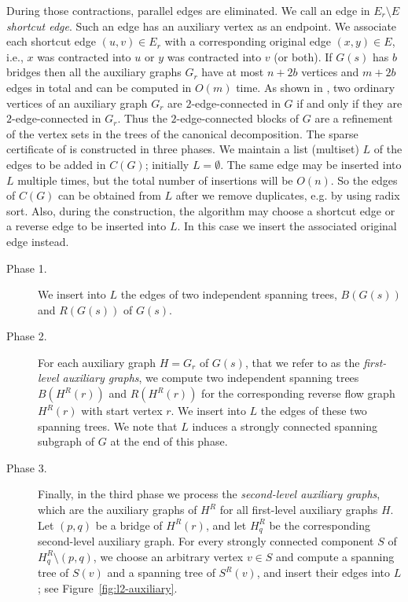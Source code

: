 \documentclass[11pt]{article}
\begin{document}
During those contractions, parallel edges are eliminated. We call an edge in $E_r \setminus E$ \emph{shortcut edge}. Such an edge has an auxiliary vertex as an endpoint.
We associate each shortcut edge $(u,v) \in E_r$  with a corresponding original edge $(x,y) \in E$, i.e., $x$ was contracted into $u$ or $y$ was contracted into $v$ (or both).
If $G(s)$ has $b$ bridges then all the auxiliary graphs $G_r$ have at most $n+2b$ vertices and $m+2b$ edges in total and can be computed in $O(m)$ time.
As shown in \cite{2ECB}, two ordinary vertices of an auxiliary graph $G_r$ are $2$-edge-connected in $G$ if and only if they are $2$-edge-connected in $G_r$.
Thus the $2$-edge-connected blocks of $G$ are a refinement of the vertex sets in the trees of the canonical decomposition.
The sparse certificate of \cite{2ECB} is constructed in three phases.
We maintain a list (multiset) $L$ of the edges to be added in $C(G)$; initially $L=\emptyset$. The same edge may be inserted into $L$ multiple times, but the total number of insertions will be $O(n)$. So
the edges of $C(G)$ can be obtained from $L$ after we remove duplicates, e.g. by  using radix sort. Also, during the construction, the algorithm may choose a shortcut edge or a reverse edge to be inserted into $L$. In this case we insert the associated original edge instead.

\begin{description}
\item[Phase 1.] We insert into $L$ the edges of two independent
spanning trees, $B(G(s))$ and $R(G(s))$ of $G(s)$.

\item[Phase 2.] For each auxiliary graph $H=G_r$ of $G(s)$, that we
refer to as the \emph{first-level auxiliary graphs}, we compute
two independent spanning trees $B(H^R(r))$ and $R(H^R(r))$ for the
corresponding reverse flow graph $H^R(r)$ with start vertex $r$.
We insert into $L$ the edges of these two spanning trees. We note
that $L$ induces a strongly connected spanning subgraph of $G$ at
the end of this phase.

\item[Phase 3.] Finally, in the third phase we process the \emph{second-level auxiliary graphs}, which are the auxiliary graphs of $H^R$ for all first-level auxiliary graphs $H$.
Let $(p,q)$ be a bridge of $H^R(r)$, and let $H_q^R$ be the corresponding second-level auxiliary graph.
For every strongly connected component $S$ of $H_q^R \setminus (p,q)$, we choose an arbitrary vertex $v \in S$ and compute a spanning tree of $S(v)$ and a spanning tree of $S^R(v)$, and insert their edges into $L$; see Figure~\ref{fig:l2-auxiliary}.
\end{description}
\end{document}
